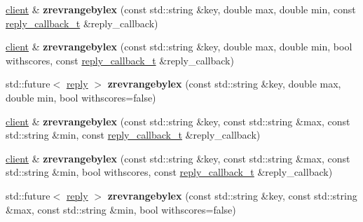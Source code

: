 \begin{DoxyCompactItemize}
\mbox{\hyperlink{classcpp__redis_1_1client}{client}} \& {\bfseries zrevrangebylex} (const std\+::string \&key, double max, double min, const \mbox{\hyperlink{classcpp__redis_1_1client_af7a65eb21aa25230bfbb0b0203c4fc04}{reply\+\_\+callback\+\_\+t}} \&reply\+\_\+callback)
\item 
\mbox{\label{classcpp__redis_1_1client_a217eef49f48f93a9f76bc12766db3fe9}} 
\mbox{\hyperlink{classcpp__redis_1_1client}{client}} \& {\bfseries zrevrangebylex} (const std\+::string \&key, double max, double min, bool withscores, const \mbox{\hyperlink{classcpp__redis_1_1client_af7a65eb21aa25230bfbb0b0203c4fc04}{reply\+\_\+callback\+\_\+t}} \&reply\+\_\+callback)
\item 
\mbox{\label{classcpp__redis_1_1client_a16fa4ec5db2c6dbb7b7defb243fb83cb}} 
std\+::future$<$ \mbox{\hyperlink{classcpp__redis_1_1reply}{reply}} $>$ {\bfseries zrevrangebylex} (const std\+::string \&key, double max, double min, bool withscores=false)
\item 
\mbox{\label{classcpp__redis_1_1client_a1434f2ba0d6a1c63de1a7ad1219c9786}} 
\mbox{\hyperlink{classcpp__redis_1_1client}{client}} \& {\bfseries zrevrangebylex} (const std\+::string \&key, const std\+::string \&max, const std\+::string \&min, const \mbox{\hyperlink{classcpp__redis_1_1client_af7a65eb21aa25230bfbb0b0203c4fc04}{reply\+\_\+callback\+\_\+t}} \&reply\+\_\+callback)
\item 
\mbox{\label{classcpp__redis_1_1client_a7334055d3b51f1b59efade093e0ee695}} 
\mbox{\hyperlink{classcpp__redis_1_1client}{client}} \& {\bfseries zrevrangebylex} (const std\+::string \&key, const std\+::string \&max, const std\+::string \&min, bool withscores, const \mbox{\hyperlink{classcpp__redis_1_1client_af7a65eb21aa25230bfbb0b0203c4fc04}{reply\+\_\+callback\+\_\+t}} \&reply\+\_\+callback)
\item 
\mbox{\label{classcpp__redis_1_1client_a14f97f6f766c825aadd5630300d07ea5}} 
std\+::future$<$ \mbox{\hyperlink{classcpp__redis_1_1reply}{reply}} $>$ {\bfseries zrevrangebylex} (const std\+::string \&key, const std\+::string \&max, const std\+::string \&min, bool withscores=false)
\item 
\mbox{\label{classcpp__redis_1_1client_a8e238a355f6567a90ce182326a478cc1}} 

\end{DoxyCompactItemize}
